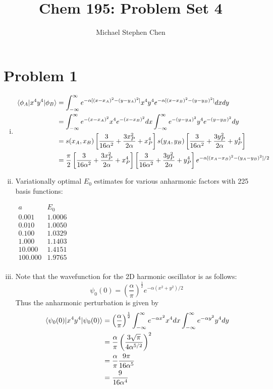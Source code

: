 \documentclass{article}
\title{Chem 195: Problem Set 4}
\author{Michael Stephen Chen}
\begin{document}
\maketitle
\pagebreak

\section*{Problem 1}
\begin{enumerate}[i)]
  \item 
    \begin{align*}
      \matrixel{\phi_A}{x^4y^4}{\phi_B} &= \int_{-\infty}^{\infty} e^{-\alpha [(x-x_A)^2 - (y-y_A)^2]}x^4y^4e^{-\alpha [(x-x_B)^2 - (y-y_B)^2]} dx dy \\
      &= \int_{-\infty}^{\infty} e^{-(x-x_A)^2}x^4e^{-(x-x_B)^2} dx \int_{-\infty}^{\infty} e^{-(y-y_A)^2}y^4e^{-(y-y_B)^2} dy \\
      &= s(x_A,x_B)\left[\frac{3}{16\alpha^2} + \frac{3x_P^2}{2\alpha}+x_P^4\right]s(y_A,y_B)\left[\frac{3}{16\alpha^2} + \frac{3y_P^2}{2\alpha}+y_P^4\right] \\
      &= \frac{\pi}{2}\left[\frac{3}{16\alpha^2} + \frac{3x_P^2}{2\alpha}+x_P^4\right]\left[\frac{3}{16\alpha^2} + \frac{3y_P^2}{2\alpha}+y_P^4\right]e^{-\alpha [(x_A-x_B)^2 - (y_A-y_B)^2]/2}
    \end{align*}

  \item Variationally optimal $E_0$ estimates for various anharmonic factors with 225 basis functions:
    \begin{center}
      $\begin{array}{c|c}
        a & E_0 \\ \hline
        0.001 & 1.0006 \\ 
        0.010 & 1.0050 \\ 
        0.100 & 1.0329 \\ 
        1.000 & 1.1403 \\ 
        10.000 & 1.4151 \\ 
        100.000 & 1.9765 \\ 
      \end{array}$
    \end{center}

  \item Note that the wavefunction for the 2D harmonic oscillator is as follows:
    $$\psi_{0}(0) = \left( \frac{\alpha}{\pi} \right)^{\frac{1}{2}} e^{-\alpha(x^2 + y^2)/2}$$
    Thus the anharmonic perturbation is given by
    \begin{align*}
      \matrixel{\psi_0(0)}{x^4y^4}{\psi_0(0)} &= \left(\frac{\alpha}{\pi}\right)^{\frac{1}{2}} \int_{-\infty}^{\infty} e^{-\alpha x^2}x^4 dx \int_{-\infty}^{\infty} e^{-\alpha y^2}y^4 dy \\
      &= \frac{\alpha}{\pi} \left( \frac{3\sqrt{\pi}}{4\alpha^{5/2}} \right)^2 \\
      &= \frac{\alpha}{\pi} \frac{9\pi}{16\alpha^5} \\
      &= \frac{9}{16\alpha^4}
    \end{align*}
    

\end{enumerate}
\end{document}
